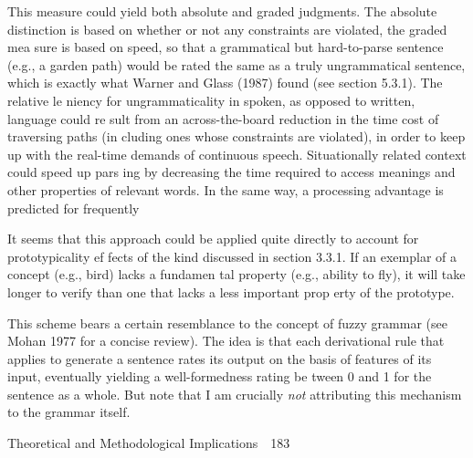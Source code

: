 \begin{styleStandard}
This measure could yield both absolute and graded judgments. The absolute distinction is based on whether or not any constraints are violated, the graded mea\- sure is based on speed, so that a grammatical but hard-to-parse sentence (e.g., a garden path) would be rated the same as a truly ungrammatical sentence, which is exactly what Warner and Glass (1987) found (see section 5.3.1). The relative le\- niency for ungrammaticality in spoken, as opposed to written, language could re\- sult from an across-the-board reduction in the time cost of traversing paths (in\- cluding ones whose constraints are violated), in order to keep up with the real-time demands of continuous speech. Situationally related context could speed up pars\- ing by decreasing the time required to access meanings and other properties of relevant words. In the same way, a processing advantage is predicted for frequently
\end{styleStandard}


\begin{listWWNumxxleveli}
\item 
\begin{styleStandard}
It seems that this approach could be applied quite directly to account for prototypicality ef\- fects of the kind discussed in section 3.3.1. If an exemplar of a concept (e.g., bird) lacks a fundamen\- tal property (e.g., ability to fly), it will take longer to verify than one that lacks a less important prop\- erty of the prototype.
\end{styleStandard}


\item 
\begin{styleStandard}
This scheme bears a certain resemblance to the concept of fuzzy grammar (see Mohan 1977 for a concise review). The idea is that each derivational rule that applies to generate a sentence rates its output on the basis of features of its input, eventually yielding a well-formedness rating be\- tween 0 and 1 for the sentence as a whole. But note that I am crucially \textit{not}\textit{ }attributing this mechanism to the grammar itself.
\end{styleStandard}


\end{listWWNumxxleveli}
\clearpage\setcounter{page}{1}\begin{styleStandard}
Theoretical and Methodological Implications\ \ 183
\end{styleStandard}


